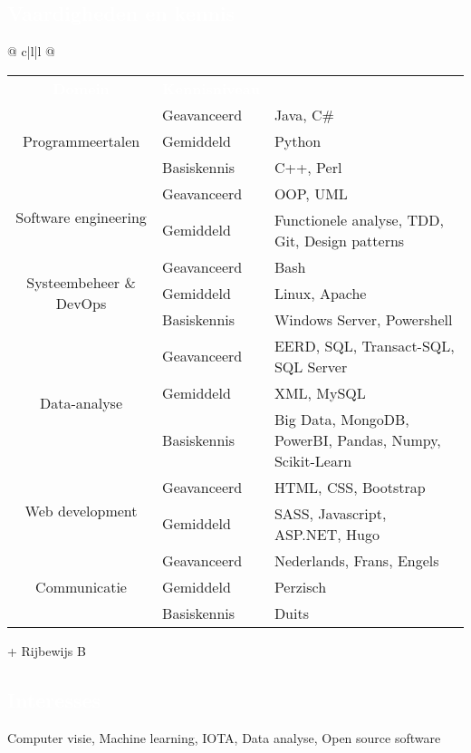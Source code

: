\documentclass[a4paper, twoside]{article}
\begin{document}
\begin{mdframed}
\section*{\textcolor{white}{Vaardigheden en kennis}}
\end{mdframed}

\noindent
\begin{tabu}{@{} c|l|l @{}}
    \begin{tabular}{c|l|l @{}}
        \cellcolor{blueDark}\textcolor{white}{\textbf{Domein}} & 
        \cellcolor{blueDark}\textcolor{white}{\textbf{Kennisniveau}} & 
        \cellcolor{blueDark}\\
        \multirow{3}{*}{Programmeertalen}        & Geavanceerd & Java, C\# \\
                                                 & Gemiddeld   & Python \\
                                                 & Basiskennis & C++, Perl \\ \hline
        \multirow{2}{*}{Software engineering}    & Geavanceerd & OOP, UML \\
                                                 & Gemiddeld   & Functionele analyse, TDD, Git, Design patterns \\ \hline
        \multirow{3}{*}{Systeembeheer \& DevOps} & Geavanceerd & Bash \\
                                                 & Gemiddeld   & Linux, Apache \\
                                                 & Basiskennis & Windows Server, Powershell \\ \hline
        \multirow{3}{*}{Data-analyse}            & Geavanceerd & EERD, SQL, Transact-SQL, SQL Server \\
                                                 & Gemiddeld   & XML, MySQL \\
                                                 & Basiskennis & Big Data, MongoDB, PowerBI, Pandas, Numpy, Scikit-Learn \\ \hline
        \multirow{2}{*}{Web development}         & Geavanceerd & HTML, CSS, Bootstrap \\
                                                 & Gemiddeld   & SASS, Javascript, ASP.NET, Hugo \\ \hline
        \multirow{3}{*}{Communicatie}            & Geavanceerd & Nederlands, Frans, Engels \\
                                                 & Gemiddeld   & Perzisch \\
                                                 & Basiskennis & Duits \\
    \end{tabular}
\end{tabu}
\ignorespaces
\noindent + Rijbewijs B

\begin{mdframed}
\section*{\textcolor{white}{Interesses}}
\end{mdframed}

\noindent Computer visie, Machine learning, IOTA, Data analyse, Open source software
\end{document}
